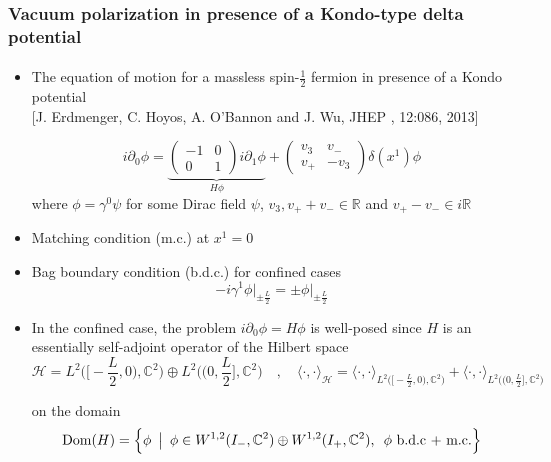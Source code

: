 \documentclass[english]{beamer}
\begin{document}
\begin{frame}[shrink=30]
\frametitle{\small{Vacuum polarization in presence of a Kondo-type delta potential}}
\framesubtitle{}
\begin{itemize}
%
\item<1-> 
The equation of motion for a massless spin-$\frac 1 2$ fermion in presence of a Kondo potential \\
\tiny\color{blue}[J. Erdmenger, C. Hoyos, A. O’Bannon and J. Wu, JHEP
, 12:086, 2013]\color{black}\normalsize

\begin{equation*}
i \partial_0 \phi = 
\underbrace{\begin{pmatrix} 
-1 & 0 \\
0 & 1 
\end{pmatrix} i \partial_1 \phi }_{H\phi}+
\begin{pmatrix}
v_3 & v_- \\
v_+ & -v_3
\end{pmatrix} \delta(x^1) \phi
\end{equation*}
where $\phi = \gamma^0\psi$ for some Dirac field $\psi$,  $v_3, v_+ + v_- \in \mathbb{R}$ and $ v_+ - v_-\in i \mathbb{R}$
%
\item<2-> Matching condition (m.c.) at $x^1 = 0$ 
%
\item<3-> Bag boundary condition (b.d.c.) for confined cases 
\begin{equation*}
- i\gamma^1 \phi \Big\vert_{\pm \frac{L}{2}} = \pm \phi \Big\vert_{\pm \frac{L}{2}}
\end{equation*}

%
\item<4-> In the confined case, the problem $i\partial_0\phi = H\phi$ is well-posed since $H$ is an essentially self-adjoint operator of the Hilbert space
\begin{equation*}
\mathcal{H} = L^{2}\Big(\big[-\frac L 2, 0\big), \mathbb{C}^2\Big) \oplus L^{2}\Big(\big(0,\frac L 2\big], \mathbb{C}^2\Big) 
\quad,\quad
\langle \cdot, \cdot\rangle_{\mathcal{H} } = \langle \cdot, \cdot\rangle_{L^{2}\big(\big[-\frac L 2, 0\big), \mathbb{C}^2\big)} +\langle \cdot, \cdot\rangle_{L^{2}\big(\big(0,\frac L 2\big], \mathbb{C}^2\big)}
\end{equation*}

 on the domain
\begin{equation*}
\mathrm{Dom}(H) = \Big \{\phi \enskip \big\vert \enskip \phi \in W^{1,2}(I_-, \mathbb{C}^2) \oplus W^{1,2}(I_+, \mathbb{C}^2), \enskip \phi \textrm{ b.d.c + m.c.} \Big \}
\end{equation*} 


\end{itemize}
\end{frame}
\end{document}
